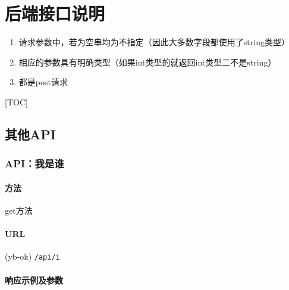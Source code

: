 \documentclass[]{article}
\date{}
\providecommand{\tightlist}{%
  \setlength{\itemsep}{0pt}\setlength{\parskip}{0pt}}
\let\oldparagraph\paragraph
\renewcommand{\paragraph}[1]{\oldparagraph{#1}\mbox{}}
\begin{document}
\hypertarget{ux540eux7aefux63a5ux53e3ux8bf4ux660e}{%
\section{后端接口说明}\label{ux540eux7aefux63a5ux53e3ux8bf4ux660e}}

\begin{enumerate}
\def\labelenumi{\arabic{enumi}.}
\tightlist
\item
  请求参数中，若为空串均为不指定（因此大多数字段都使用了string类型）
\item
  相应的参数具有明确类型（如果int类型的就返回int类型二不是string）
\item
  都是post请求
\end{enumerate}

{[}TOC{]}

\hypertarget{ux5176ux4ed6api}{%
\subsection{其他API}\label{ux5176ux4ed6api}}

\hypertarget{apiux6211ux662fux8c01}{%
\subsubsection{API：我是谁}\label{apiux6211ux662fux8c01}}

\hypertarget{ux65b9ux6cd5}{%
\paragraph{方法}\label{ux65b9ux6cd5}}

get方法

\hypertarget{url}{%
\paragraph{URL}\label{url}}

(yb-ok) \texttt{/api/i}

\hypertarget{ux54cdux5e94ux793aux4f8bux53caux53c2ux6570}{%
\paragraph{响应示例及参数}\label{ux54cdux5e94ux793aux4f8bux53caux53c2ux6570}}

\begin{Shaded}
\begin{Highlighting}[]
\FunctionTok{\{}
     \FunctionTok{:} \FunctionTok{,}
    \FunctionTok{:}\FunctionTok{,}
    \FunctionTok{:}\FunctionTok{,}
    \FunctionTok{:}
\FunctionTok{\}}
\end{Highlighting}
\end{Shaded}
\end{document}
